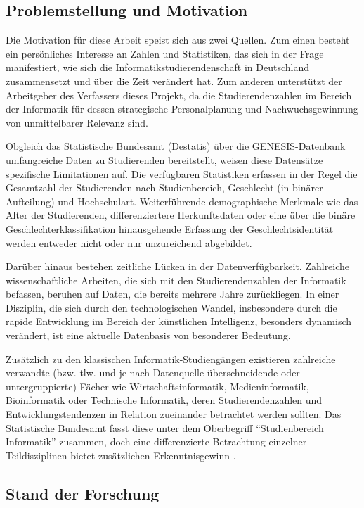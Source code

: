 \subsection{Problemstellung und Motivation}

Die Motivation für diese Arbeit speist sich aus zwei Quellen. Zum einen besteht ein persönliches Interesse an Zahlen und Statistiken, das sich in der Frage manifestiert, wie sich die Informatikstudierendenschaft in Deutschland zusammensetzt und über die Zeit verändert hat. Zum anderen unterstützt der Arbeitgeber des Verfassers dieses Projekt, da die Studierendenzahlen im Bereich der Informatik für dessen strategische Personalplanung und Nachwuchsgewinnung von unmittelbarer Relevanz sind.

Obgleich das Statistische Bundesamt (Destatis) über die GENESIS-Datenbank umfangreiche Daten zu Studierenden bereitstellt, weisen diese Datensätze spezifische Limitationen auf. Die verfügbaren Statistiken erfassen in der Regel die Gesamtzahl der Studierenden nach Studienbereich, Geschlecht (in binärer Aufteilung) und Hochschulart. Weiterführende demographische Merkmale wie das Alter der Studierenden, differenziertere Herkunftsdaten oder eine über die binäre Geschlechterklassifikation hinausgehende Erfassung der Geschlechtsidentität werden entweder nicht oder nur unzureichend abgebildet.

Darüber hinaus bestehen zeitliche Lücken in der Datenverfügbarkeit. Zahlreiche wissenschaftliche Arbeiten, die sich mit den Studierendenzahlen der Informatik befassen, beruhen auf Daten, die bereits mehrere Jahre zurückliegen. In einer Disziplin, die sich durch den technologischen Wandel, insbesondere durch die rapide Entwicklung im Bereich der künstlichen Intelligenz, besonders dynamisch verändert, ist eine aktuelle Datenbasis von besonderer Bedeutung.

Zusätzlich zu den klassischen Informatik-Studiengängen existieren zahlreiche verwandte (bzw. tlw. und je nach Datenquelle überschneidende oder untergruppierte) Fächer wie Wirtschaftsinformatik, Medieninformatik, Bioinformatik oder Technische Informatik, deren Studierendenzahlen und Entwicklungstendenzen in Relation zueinander betrachtet werden sollten. Das Statistische Bundesamt fasst diese unter dem Oberbegriff ``Studienbereich Informatik'' zusammen, doch eine differenzierte Betrachtung einzelner Teildisziplinen bietet zusätzlichen Erkenntnisgewinn \cite{schauerWirtschaftsinformatik2021}.

\subsection{Stand der Forschung}

